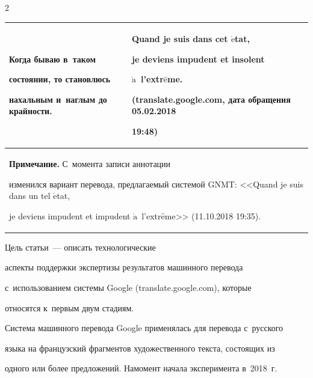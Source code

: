 \begin{multicols}{2}
\begin{table}
\begin{center}
\begin{tabular}{|p{70mm}|p{70mm}|}


\hline


\textbf{Когда} бываю в~таком 


состоянии, \textbf{то} становлюсь 


нахальным и~наглым до крайности. &


\textbf{Quand} je suis dans cet $\acute{\mbox{e}}$tat, 


je deviens impudent et insolent 


$\grave{\mbox{a}}$~l'extr$\hat{\mbox{e}}$me.\newline 


({\sf translate.google.com}, дата обращения 05.02.2018 


19:48)\\


\hline


\multicolumn{2}{p{142mm}}{\footnotesize \hspace*{2mm}\textbf{Примечание.} С~момента записи аннотации 


изменился вариант перевода, предлагаемый системой GNMT: <<Quand je suis dans un tel $\acute{\mbox{e}}$tat, 


je deviens impudent et impudent $\grave{\mbox{a}}$~l'extr$\hat{\mbox{e}}$me>> (11.10.2018 19:35).}


\end{tabular}


\end{center}


\end{table}





 Цель статьи~--- описать технологические 


аспекты поддержки экспертизы результатов машинного перевода 


с~использованием сис\-те\-мы Google ({\sf translate.google.com}), которые 


относятся к~первым двум стадиям.


  


  Система машинного перевода Google при\-ме\-нялась для перевода с~русского 


языка на фран\-цузский фрагментов художественного текста, состоящих из 


одного или более предложений. На\linebreak момент начала эксперимента в~2018~г.\ 



\end{multicols}
